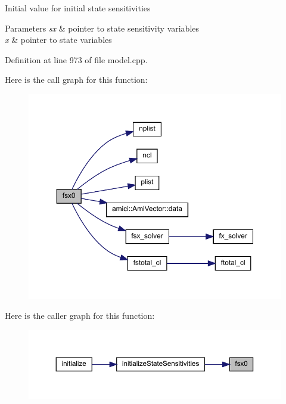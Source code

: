Initial value for initial state sensitivities 
\begin{DoxyParams}{Parameters}
{\em sx} & pointer to state sensitivity variables \\
\hline
{\em x} & pointer to state variables \\
\hline
\end{DoxyParams}


Definition at line 973 of file model.\+cpp.

Here is the call graph for this function\+:
\nopagebreak
\begin{figure}[H]
\begin{center}
\leavevmode
\includegraphics[width=350pt]{classamici_1_1_model_a6f46a63f0524ad25e4125254b78fdee9_cgraph}
\end{center}
\end{figure}
Here is the caller graph for this function\+:
\nopagebreak
\begin{figure}[H]
\begin{center}
\leavevmode
\includegraphics[width=350pt]{classamici_1_1_model_a6f46a63f0524ad25e4125254b78fdee9_icgraph}
\end{center}
\end{figure}
\mbox{\label{classamici_1_1_model_acd951497e01220e545bbb238cc48e7bb}} 
